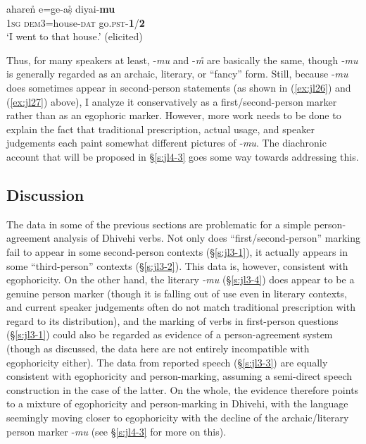 \documentclass[output=paper]{langsci/langscibook}
\begin{document}
\begin{exe}
	\ex 	\label{ex:jl28}
	\gll aharen̊ e=ge-aṣ̊ diyai-\textbf{mu}\\
	1\textsc{sg} \textsc{dem}3=house-\textsc{dat} go.\textsc{pst}-\textbf{1}/\textbf{2}\\
	\trans ‘I went to that house.’ (elicited)
\end{exe}

Thus, for many speakers at least, -\textit{mu} and -\textit{m̊} are basically the same, though ‑\textit{mu} is generally regarded as an archaic, literary, or “fancy” form. Still, because ‑\textit{mu} does sometimes appear in second-person statements (as shown in (\ref{ex:jl26}) and (\ref{ex:jl27}) above), I analyze it conservatively as a first/second-person marker rather than as an egophoric marker. However, more work needs to be done to explain the fact that traditional prescription, actual usage, and speaker judgements each paint somewhat different pictures of ‑\textit{mu}. The diachronic account that will be proposed in §\ref{s:jl4-3} goes some way towards addressing this.

\subsection{Discussion}\label{s:jl3-5}

The data in some of the previous sections are problematic for a simple person-agreement analysis of Dhivehi verbs. Not only does “first/second-person” marking fail to appear in some second-person contexts (§‎\ref{s:jl3-1}), it actually appears in some “third-person” contexts (§‎\ref{s:jl3-2}). This data is, however, consistent with egophoricity. On the other hand, the literary ‑\textit{mu} (§‎\ref{s:jl3-4}) does appear to be a genuine person marker (though it is falling out of use even in literary contexts, and current speaker judgements often do not match traditional prescription with regard to its distribution), and the marking of verbs in first-person questions (§\ref{s:jl3-1}) could also be regarded as evidence of a person-agreement system (though as discussed, the data here are not entirely incompatible with egophoricity either). The data from reported speech (§‎\ref{s:jl3-3}) are equally consistent with egophoricity and person-marking, assuming a semi-direct speech construction in the case of the latter. On the whole, the evidence therefore points to a mixture of egophoricity and person-marking in Dhivehi, with the language seemingly moving closer to egophoricity with the decline of the archaic/literary person marker ‑\textit{mu} (see §\ref{s:jl4-3} for more on this).
\end{document}
